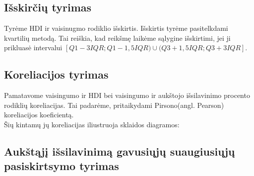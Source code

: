 \subsection{Išskirčių tyrimas}
Tyrėme HDI ir vaisinugmo rodiklio išskirtis.
Išskirtis tyrėme pasitelkdami kvartilių metodą. Tai reiškia, kad reikšmę laikėme sąlygine išskirtimi, jei ji prikluasė intervalui $[Q1-3IQR; Q1-1,5IQR) \cup (Q3+1,5IQR; Q3+3IQR]$.

\subsection{Koreliacijos tyrimas}
Pamatavome vaisingumo ir HDI bei vaisingumo ir aukštojo išsilavinimo procento rodiklių koreliacijas. Tai padarėme, pritaikydami Pirsono(angl. Pearson) koreliacijos koeficientą. \\

Šių kintamų jų koreliacijas iliustruoja sklaidos diagramos:

\subsection{Aukštąjį išsilavinimą gavusiųjų suaugiusiųjų pasiskirtsymo tyrimas} 